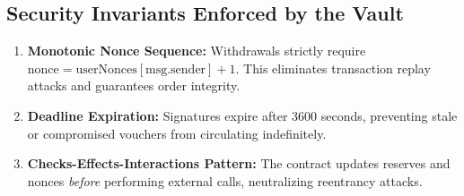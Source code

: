 \subsection{Security Invariants Enforced by the Vault}
\begin{enumerate}[leftmargin=1.5em]
    \item \textbf{Monotonic Nonce Sequence:} Withdrawals strictly require $\text{nonce} = \text{userNonces}[\text{msg.sender}] + 1$. This eliminates transaction replay attacks and guarantees order integrity.
    \item \textbf{Deadline Expiration:} Signatures expire after 3600 seconds, preventing stale or compromised vouchers from circulating indefinitely.
    \item \textbf{Checks-Effects-Interactions Pattern:} The contract updates reserves and nonces \textit{before} performing external calls, neutralizing reentrancy attacks.
\end{enumerate}
